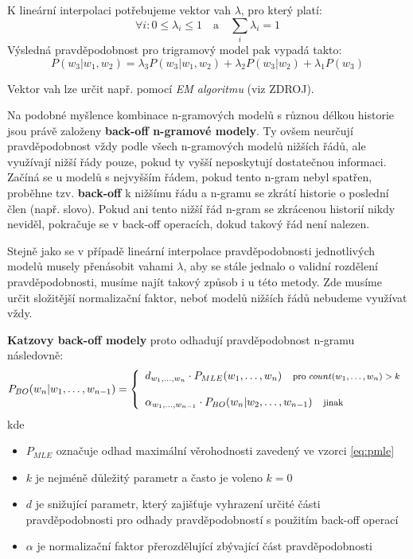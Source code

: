 \documentclass[12pt,a4paper]{report}
\begin{document}
K lineární interpolaci potřebujeme vektor vah $\lambda$, pro který platí:
\begin{equation}
\forall i : 0 \leq \lambda_i \leq 1 \quad \text{a} \quad \sum_{i} \lambda_i = 1
\end{equation}
Výsledná pravděpodobnost pro trigramový model pak vypadá takto:
\begin{equation}
P(w_3|w_1, w_2) = \lambda_3 P(w_3|w_1,w_2) + \lambda_2 P(w_3|w_2) + \lambda_1 P(w_3)
\end{equation}

Vektor vah lze určit např. pomocí \textit{EM algoritmu} (viz ZDROJ).

Na podobné myšlence kombinace n-gramových modelů s různou délkou historie jsou právě založeny \textbf{back-off n-gramové modely}. Ty ovšem neurčují pravděpodobnost vždy podle všech n-gramových modelů nižších řádů, ale využívají nižší řády pouze, pokud ty vyšší neposkytují dostatečnou informaci. Začíná se u modelů s nejvyšším řádem, pokud tento n-gram nebyl spatřen, proběhne tzv. \textbf{back-off} k nižšímu řádu a n-gramu se zkrátí historie o poslední člen (např. slovo). Pokud ani tento nižší řád n-gram se zkrácenou historií nikdy neviděl, pokračuje se v back-off operacích, dokud takový řád není nalezen.

Stejně jako se v případě lineární interpolace pravděpodobnosti jednotlivých modelů musely přenásobit vahami $\lambda$, aby se stále jednalo o validní rozdělení pravděpodobnosti, musíme najít takový způsob i u této metody. Zde musíme určit složitější normalizační faktor, neboť modelů nižších řádů nebudeme využívat vždy.

\textbf{Katzovy back-off modely} proto odhadují pravděpodobnost n-gramu následovně:
\begin{equation}
P_{BO}(w_n|w_1, \ldots, w_{n-1}) = \left\{
\begin{array}{l}
d_{w_1, \ldots, w_n} \cdot P_{MLE}(w_1, \ldots, w_n) \quad \text{\footnotesize pro $count(w_1, \ldots, w_n) > k$} \\
\\
\alpha_{w_1, \ldots, w_{n-1}} \cdot P_{BO}(w_n|w_2, \ldots, w_{n-1}) \quad \text{\footnotesize jinak} 
\end{array}\right.
\end{equation}
kde \begin{itemize}
\item{$P_{MLE}$ označuje odhad maximální věrohodnosti zavedený ve vzorci \eqref{eq:pmle}}
\item{$k$ je nejméně důležitý parametr a často je voleno $k = 0$}
\item{$d$ je snižující parametr, který zajišťuje vyhrazení určité části pravděpodobnosti pro odhady pravděpodobností s použitím back-off operací}
\item{$\alpha$ je normalizační faktor přerozdělující zbývající část pravděpodobnosti}
\end{itemize}
\end{document}
